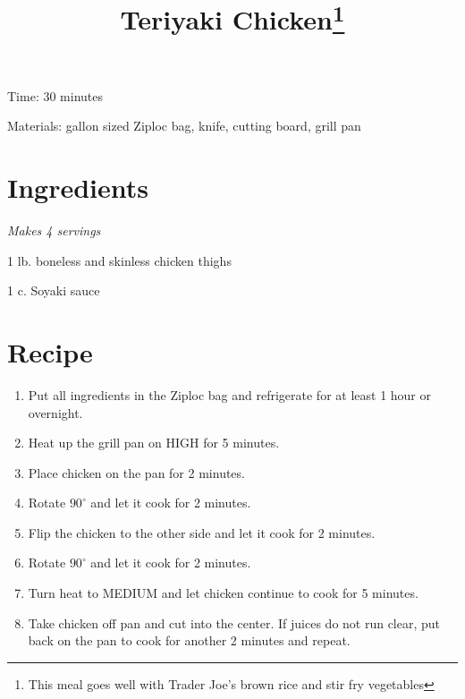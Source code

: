 \documentclass{article}
\title{Teriyaki Chicken\footnote{This meal goes well with Trader Joe's brown rice and stir fry vegetables}}
\begin{document}
Time: 30 minutes

Materials: gallon sized Ziploc bag, knife, cutting board, grill pan

\section{Ingredients}
\textit{Makes 4 servings}

1 lb. boneless and skinless chicken thighs

1 c. Soyaki sauce 

\section{Recipe}
\begin{enumerate}
\item{Put all ingredients in the Ziploc bag and refrigerate for at least 1 hour or overnight.}
\item{Heat up the grill pan on HIGH for 5 minutes.}
\item{Place chicken on the pan for 2 minutes.}
\item{Rotate $90^{\circ}$ and let it cook for 2 minutes.}
\item{Flip the chicken to the other side and let it cook for 2 minutes.}
\item{Rotate $90^{\circ}$ and let it cook for 2 minutes.}
\item{Turn heat to MEDIUM and let chicken continue to cook for 5 minutes.}
\item{Take chicken off pan and cut into the center. If juices do not run clear, put back on the pan to cook for another 2 minutes and repeat.}
\end{enumerate}
\end{document}
